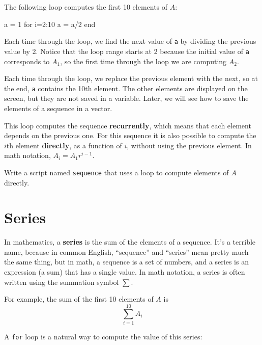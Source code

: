 The following loop computes the first 10 elements of $A$:

\begin{code}
a = 1
for i=2:10
    a = a/2
end
\end{code}

Each time through the loop, we find the next value of {\tt a}
by dividing the previous value by 2.  Notice that the loop
range starts at 2 because the initial value of {\tt a} corresponds
to $A_1$, so the first time through the loop we are computing
$A_2$.

Each time through the loop, we replace the previous element with
the next, so at the end, {\tt a} contains the 10th element.  The
other elements are displayed on the screen, but they are not saved
in a variable.  Later, we will see how to save the elements
of a sequence in a vector.


This loop computes the sequence {\bf recurrently}, which means
that each element depends on the previous one.
For this sequence it is also possible to compute the $i$th element
{\bf directly}, as a function of $i$, without using the previous element.
In math notation, $A_i = A_1 r^{i-1}$. 


\begin{ex}
Write a script named {\tt sequence} that uses a loop to 
compute elements of $A$ directly.
\end{ex}


\section{Series}
\label{series}

In mathematics, a {\bf series} is the sum of the elements of
a sequence.  It's a terrible name, because in common English,
``sequence'' and ``series'' mean pretty much the same thing, but in
math, a sequence is a set of numbers, and a series is an expression
(a sum) that has a single value.  In math notation, a series
is often written using the summation symbol $\sum$.


For example, the sum of the first 10 elements of $A$ is
\begin{equation}
\sum_{i=1}^{10} A_i
\end{equation}

A {\tt for} loop is a natural way to compute the value of this
series:

